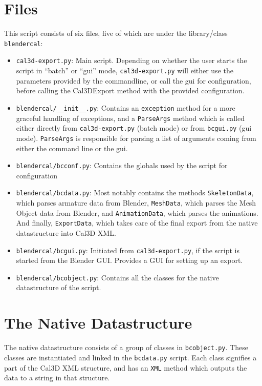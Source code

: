 

\section*{Files}
This script consists of six files, five of which are under the library/class \texttt{blendercal}:
\begin{itemize}
\item \texttt{cal3d-export.py}: Main script. Depending on whether the user starts the script in ``batch'' or ``gui'' mode, \texttt{cal3d-export.py} will either use the parameters provided by the commandline, or call the gui for configuration, before calling the Cal3DExport method with the provided configuration.
\item \texttt{blendercal/\_\_init\_\_.py}: Contains an \texttt{exception} method for a more graceful handling of exceptions, and a \texttt{ParseArgs} method which is called either directly from \texttt{cal3d-export.py} (batch mode) or from \texttt{bcgui.py} (gui mode). \texttt{ParseArgs} is responsible for parsing a list of arguments coming from either the command line or the gui.
\item \texttt{blendercal/bcconf.py}: Contains the globals used by the script for configuration
\item \texttt{blendercal/bcdata.py}: Most notably contains the methods \texttt{SkeletonData}, which parses armature data from Blender, \texttt{MeshData}, which parses the Mesh Object data from Blender, and \texttt{AnimationData}, which parses the animations. And finally, \texttt{ExportData}, which takes care of the final export from the native datastructure into Cal3D XML.
\item \texttt{blendercal/bcgui.py}: Initiated from \texttt{cal3d-export.py}, if the script is started from the Blender GUI. Provides a GUI for setting up an export.
\item \texttt{blendercal/bcobject.py}: Contains all the classes for the native datastructure of the script.
\end{itemize}

\section*{The Native Datastructure}
The native datastructure consists of a group of classes in \texttt{bcobject.py}. These classes are instantiated and linked in the \texttt{bcdata.py} script. Each class signifies a part of the Cal3D XML structure, and has an \texttt{XML} method which outputs the data to a string in that structure.

